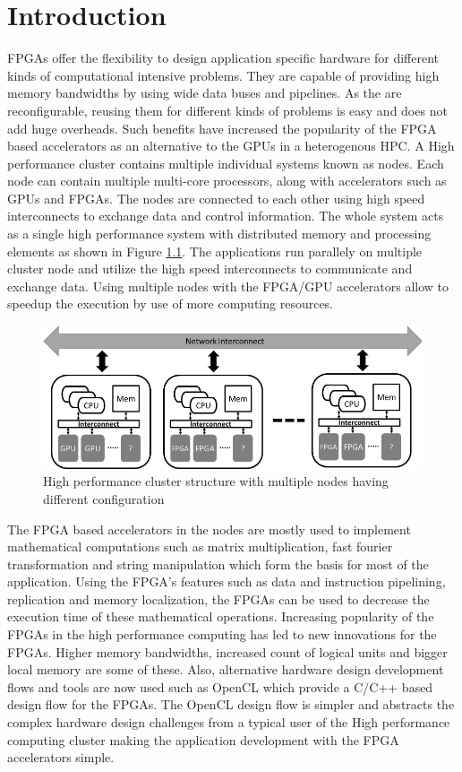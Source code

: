 \chapter{Introduction}
\label{cha:Introduction}

FPGAs offer the flexibility to design application specific hardware
for different kinds of computational intensive problems. They are capable
of providing high memory bandwidths by using wide data buses and pipelines.
As the are reconfigurable, reusing them for different kinds of problems
is easy and does not add huge overheads. Such benefits have increased
the popularity of the FPGA based accelerators as an alternative to the
GPUs in a heterogenous \ac{HPC}.
A High performance cluster contains multiple individual
systems known as nodes. Each node can contain multiple multi-core processors,
along with accelerators such as GPUs and FPGAs. The nodes are connected to each other
using high speed interconnects to exchange data and control information. The whole system acts
as a single high performance system with distributed memory and processing elements as
shown in Figure \ref{fig:cluster}. The applications run parallely on multiple cluster node
and utilize the high speed interconnects to communicate and exchange data. Using
multiple nodes with the FPGA/GPU accelerators allow to speedup the execution by use of more computing resources.
\begin{figure}[ht]%
    \centering
    \includegraphics[width=1.0\textwidth]{images/cluster}
    \caption{High performance cluster structure with multiple nodes having different configuration}
    \label{fig:cluster}
\end{figure}

The FPGA based accelerators in the nodes are mostly used to implement mathematical computations such
as matrix multiplication, fast fourier transformation and string manipulation which form the
basis for most of the application. Using the FPGA's features such as data and instruction pipelining,
replication and memory localization, the FPGAs can be used to decrease the execution time of
these mathematical operations. Increasing popularity of the FPGAs in the high performance
computing has led to new innovations for the FPGAs. Higher memory bandwidths, increased count
of logical units and bigger local memory are some of these. Also, alternative hardware design development
flows and tools are now used such as OpenCL which provide a C/C++ based design flow for
the FPGAs. The OpenCL design flow is simpler and abstracts the complex hardware design
challenges from a typical user of the High performance computing cluster making
the application development with the FPGA accelerators simple.

